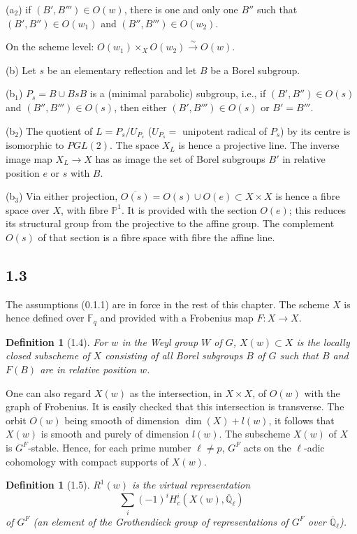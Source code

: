 \documentclass[11pt]{amsart}
\theoremstyle{plain}
\newtheorem{definition}[theorem]{Definition}
\theoremstyle{remark}
\begin{document}
(a$_2$) if $(B', B''') \in O(w)$, there is one and only one $B''$ such that $(B', B'') \in O(w_1)$ and $(B'', B''') \in O(w_2)$.

On the scheme level: $O(w_1) \times_X O(w_2) \xrightarrow{\sim} O(w)$.

(b) Let $s$ be an elementary reflection and let $B$ be a Borel subgroup.

(b$_1$) $P_s = B \cup BsB$ is a (minimal parabolic) subgroup, i.e., if $(B', B'') \in O(s)$ and $(B'', B''') \in O(s)$, then either $(B', B''') \in O(s)$ or $B' = B'''$.

(b$_2$) The quotient of $L = P_s/U_{P_s}$ ($U_{P_s} =$ unipotent radical of $P_s$) by its centre is isomorphic to $PGL(2)$. The space $X_L$ is hence a projective line. The inverse image map $X_L \to X$ has as image the set of Borel subgroups $B'$ in relative position $e$ or $s$ with $B$.

(b$_3$) Via either projection, $\overline{O(s)} = O(s) \cup O(e) \subset X \times X$ is hence a fibre space over $X$, with fibre $\mathbb{P}^1$. It is provided with the section $O(e)$; this reduces its structural group from the projective to the affine group. The complement $O(s)$ of that section is a fibre space with fibre the affine line.

\subsection{1.3} The assumptions (0.1.1) are in force in the rest of this chapter. The scheme $X$ is hence defined over $\mathbb{F}_q$ and provided with a Frobenius map $F: X \to X$.

\begin{definition}[1.4]
For $w$ in the Weyl group $W$ of $G$, $X(w) \subset X$ is the locally closed subscheme of $X$ consisting of all Borel subgroups $B$ of $G$ such that $B$ and $F(B)$ are in relative position $w$.
\end{definition}

One can also regard $X(w)$ as the intersection, in $X \times X$, of $O(w)$ with the graph of Frobenius. It is easily checked that this intersection is transverse. The orbit $O(w)$ being smooth of dimension $\dim(X) + l(w)$, it follows that $X(w)$ is smooth and purely of dimension $l(w)$. The subscheme $X(w)$ of $X$ is $G^F$-stable. Hence, for each prime number $\ell \neq p$, $G^F$ acts on the $\ell$-adic cohomology with compact supports of $X(w)$.

\begin{definition}[1.5]
$R^1(w)$ is the virtual representation
\[
\sum_i (-1)^i H_c^i(X(w), \overline{\mathbb{Q}}_\ell)
\]
of $G^F$ (an element of the Grothendieck group of representations of $G^F$ over $\overline{\mathbb{Q}}_\ell$).
\end{definition}
\end{document}
